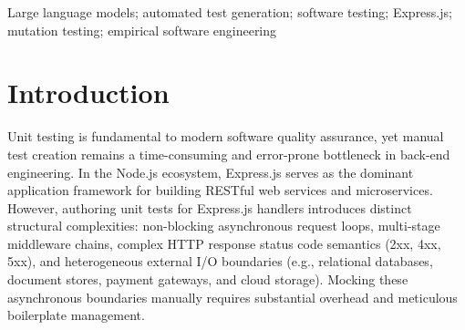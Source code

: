 \documentclass[conference]{IEEEtran}
\begin{document}
\begin{abstract}
Automated unit test generation is pivotal to software reliability in asynchronous Node.js microservices. While Large Language Models (LLMs) demonstrate strong code synthesis, empirical evaluations comparing publicly accessible LLM endpoints available without direct API charges during the study period remain limited. This paper reports a single deterministic-decoding run ($T=0$) comparing two such models---\textit{gemini-3.6-flash} (Google Cloud, GA July 2026)~\cite{gemini36flashcard} and \textit{gpt-oss-120b} (OpenAI open-weight model via Groq, August 2025)~\cite{openaiopts120b}---across 25 realistic Express.js controllers written in native ES Modules (ESM). Tests were executed under Jest (\texttt{--experimental-vm-modules}) and evaluated on suite success rate, assertion pass rate, line coverage, and Stryker JS mutation testing. In this single run, \textit{gemini-3.6-flash} achieved a 100\% suite success rate (25/25), 439 passing assertions with zero execution errors, 94.73\% mean line coverage, and an 87.87\% mutation score (3,367/3,832 mutants killed). \textit{gpt-oss-120b} achieved a 72\% suite success rate (18/25), 62.71\% mean line coverage, and a 59.79\% overall mutation score (81.41\% on its 18 executable suites), with 7 suites failing due to ESM module-hoisting violations and explicit import omissions. Exact binomial McNemar's ($p = 0.0156$) and exact Wilcoxon signed-rank ($p \approx 0.00024$) tests indicate the observed gap is unlikely to be a coincidence of this particular run, but because both models are queried only once per controller, these results should be read as a preliminary, single-run signal rather than a stable estimate of either model's true reliability; we discuss this limitation explicitly and outline a repeated-trial protocol for future replication.
\end{abstract}

\begin{IEEEkeywords}
Large language models; automated test generation; software testing; Express.js; mutation testing; empirical software engineering
\end{IEEEkeywords}

\section{Introduction}

Unit testing is fundamental to modern software quality assurance, yet manual test creation remains a time-consuming and error-prone bottleneck in back-end engineering. In the Node.js ecosystem, Express.js serves as the dominant application framework for building RESTful web services and microservices. However, authoring unit tests for Express.js handlers introduces distinct structural complexities: non-blocking asynchronous request loops, multi-stage middleware chains, complex HTTP response status code semantics (2xx, 4xx, 5xx), and heterogeneous external I/O boundaries (e.g., relational databases, document stores, payment gateways, and cloud storage). Mocking these asynchronous boundaries manually requires substantial overhead and meticulous boilerplate management.
\end{document}
